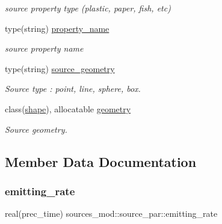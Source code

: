 \begin{DoxyCompactItemize}
\begin{DoxyCompactList}\small\item\em source property type (plastic, paper, fish, etc) \end{DoxyCompactList}\item 
type(string) \hyperlink{structsources__mod_1_1source__par_a5939a7c20bad9ac30bc9bef0427a5336}{property\+\_\+name}
\begin{DoxyCompactList}\small\item\em source property name \end{DoxyCompactList}\item 
type(string) \hyperlink{structsources__mod_1_1source__par_a66e7627f128290f25c2c9eb36808eb5b}{source\+\_\+geometry}
\begin{DoxyCompactList}\small\item\em Source type \+: \textquotesingle{}point\textquotesingle{}, \textquotesingle{}line\textquotesingle{}, \textquotesingle{}sphere\textquotesingle{}, \textquotesingle{}box\textquotesingle{}. \end{DoxyCompactList}\item 
class(\hyperlink{structgeometry__mod_1_1shape}{shape}), allocatable \hyperlink{structsources__mod_1_1source__par_abf09d59fd65f02d1a8139e2f9f477207}{geometry}
\begin{DoxyCompactList}\small\item\em Source geometry. \end{DoxyCompactList}\end{DoxyCompactItemize}


\subsection{Member Data Documentation}
\mbox{\label{structsources__mod_1_1source__par_af5e6a5cc49766a9fb90fedadebb64b87}} 
\subsubsection{\texorpdfstring{emitting\+\_\+rate}{emitting\_rate}}
{\footnotesize\ttfamily real(prec\+\_\+time) sources\+\_\+mod\+::source\+\_\+par\+::emitting\+\_\+rate\hspace{0.3cm}{\ttfamily [private]}}



